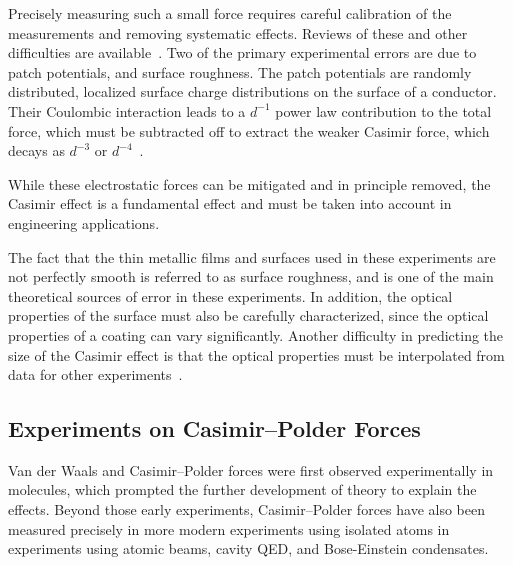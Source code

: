 Precisely measuring such a small force requires careful calibration of the measurements 
and removing systematic effects.  Reviews of these and other difficulties are available~\citep{Lamoreaux2011, vanZwol2011, Bordag2009}.
Two of the primary experimental errors are due to 
patch potentials, and surface roughness.  
The patch potentials are randomly distributed, localized surface charge distributions on the surface of a conductor.  
Their Coulombic interaction leads to a $d^{-1}$ power law contribution to the total force, 
which must be subtracted off to extract the weaker Casimir force, which decays as $d^{-3}$ or $d^{-4}$~\citep{Sushkov2011}.  

 While these electrostatic forces can be mitigated and in principle removed, the Casimir effect is a fundamental 
 effect and must be taken into account in engineering applications.  

The fact that the thin metallic films and surfaces used in these 
experiments are not perfectly smooth is referred to as surface roughness, and is one of 
the main theoretical sources of error in these experiments.  
In addition, the optical properties of the surface must also be carefully characterized, since the 
optical properties of a coating can vary significantly.  Another difficulty in predicting the size of the 
Casimir effect is that the optical properties must be interpolated from data for other experiments~\citep{vanZwol2011}.

\subsection{Experiments on Casimir--Polder Forces}

Van der Waals and Casimir--Polder forces were first observed experimentally in molecules, 
which prompted the further development of theory to explain the effects.  
Beyond those early experiments, Casimir--Polder forces have also been measured precisely in more modern experiments  
using isolated atoms in experiments using atomic beams, cavity QED, and Bose-Einstein condensates.  

